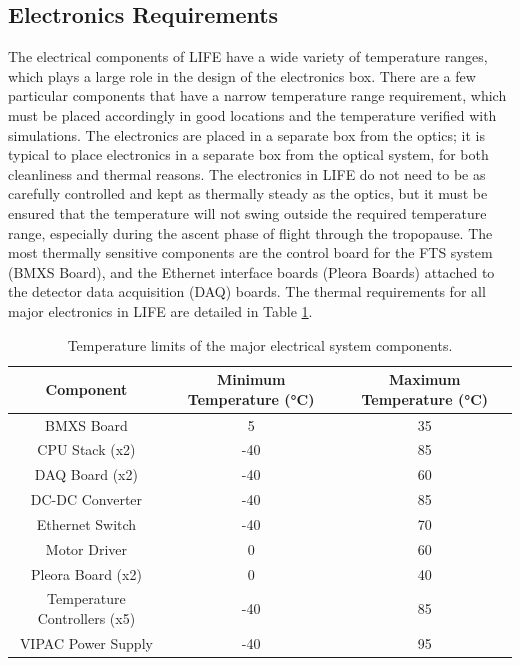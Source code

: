 \subsection{Electronics Requirements}\label{electronics_reqs}
The electrical components of LIFE have a wide variety of temperature ranges, which plays a large role in the design of the electronics box. There are a few particular components that have a narrow temperature range requirement, which must be placed accordingly in good locations and the temperature verified with simulations. The electronics are placed in a separate box from the optics; it is typical to place electronics in a separate box from the optical system, for both cleanliness and thermal reasons. The electronics in LIFE do not need to be as carefully controlled and kept as thermally steady as the optics, but it must be ensured that the temperature will not swing outside the required temperature range, especially during the ascent phase of flight through the tropopause. The most thermally sensitive components are the control board for the FTS system (BMXS Board), and the Ethernet interface boards (Pleora Boards) attached to the detector data acquisition (DAQ) boards. The thermal requirements for all major electronics in LIFE are detailed in Table \ref{therm_req_table}. 

\begin{table}[h]
\begin{center}
\begin{tabular}{ |c|c|c| }
 \hline
 \rowcolor{lightgray}
 Component & Minimum Temperature (°C) & Maximum Temperature (°C)\\
  \hline
  \hline
 BMXS Board  & 5 & 35 \\
 \hline
 CPU Stack (x2)  & -40 & 85 \\
 \hline
 DAQ Board (x2)  & -40 & 60 \\
 \hline
 DC-DC Converter & -40 & 85 \\
 \hline
 Ethernet Switch & -40 & 70 \\
 \hline
 Motor Driver & 0 & 60 \\
 \hline
 Pleora Board (x2)  & 0 & 40 \\
 \hline
 Temperature Controllers (x5) & -40 & 85 \\
 \hline
 VIPAC Power Supply & -40 & 95 \\
 \hline
\end{tabular}
\end{center}
\caption{Temperature limits of the major electrical system components.}
 \label{therm_req_table}
\end{table}

